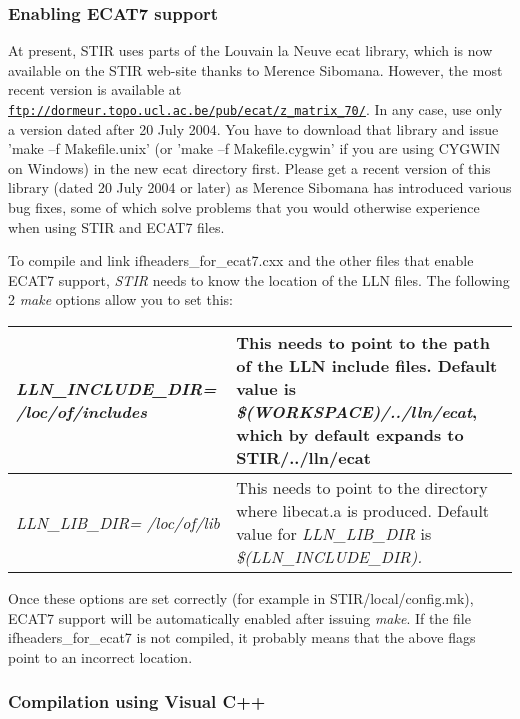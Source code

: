 \documentclass{article}
\def\R2Lurl#1#2{\mbox{\href{#1}{\tt #2}}}
\begin{document}
\subsubsection{
Enabling ECAT7 support}
\label{sec:ECAT7support}
At present, STIR uses parts of the Louvain la Neuve ecat library, 
which is now available on the STIR web-site thanks to Merence 
Sibomana. However, the most recent version is available at \R2Lurl{ftp://dormeur.topo.ucl.ac.be/pub/ecat/z_matrix_70/ }{ftp://dormeur.topo.ucl.ac.be/pub/ecat/z\_matrix\_70/}. 
In any case, use only a version dated after 20 July 2004. You 
have to download that library and issue 'make --f Makefile.unix' 
(or 'make --f Makefile.cygwin' if you are using CYGWIN on Windows) 
in the new ecat directory first. Please get a recent version 
of this library (dated 20 July 2004 or later) as Merence Sibomana 
has introduced various bug fixes, some of which solve problems 
that you would otherwise experience when using STIR and ECAT7 
files.


To compile and link ifheaders\_for\_ecat7.cxx and the other files 
that enable ECAT7 support, \textit{STIR} needs to know the location 
of the LLN files. The following 2 \textit{make} options allow you 
to set this:



\begin{longtable}{|p{\MakeTableFirstCol}|p{\MakeTableSecondCol}|}
\hline
\raggedright
\textit{LLN\_INCLUDE\_DIR=\linebreak
/loc/of/includes} &
This needs to point to the path of the LLN include files. Default 
value is \textit{\$(WORKSPACE)/../lln/ecat}, which by default expands 
to \textbf{STIR/../lln/ecat}\\
\hline
{\raggedright \textit{LLN\_LIB\_DIR= \linebreak
/loc/of/lib}} & 
{\raggedright This needs to point to the directory where libecat.a is produced. 
Default value for \textit{LLN\_LIB\_DIR} is \textit{\$(LLN\_INCLUDE\_DIR).}} \\
\hline
\end{longtable}


Once these options are set correctly (for example in STIR/local/config.mk), 
ECAT7 support will be automatically enabled after issuing \textit{make}. 
If the file ifheaders\_for\_ecat7 is not compiled, it probably 
means that the above flags point to an incorrect location.

\subsubsection{
Compilation using Visual C++}
\label{sec:VC}
\end{document}
